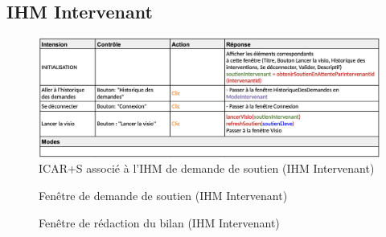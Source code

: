 \subsection{IHM Intervenant}

\begin{figure}[H]
    \centering
    \includegraphics[width=13cm]{ICARS/demandeInter.png}
    \caption{ICAR+S associé à l'IHM de demande de soutien (IHM Intervenant)}
\end{figure}

\begin{figure}[H]
    \centering
    \caption{Fenêtre de demande de soutien (IHM Intervenant)}
\end{figure}


\begin{figure}[H]
    \centering
    \caption{Fenêtre de rédaction du bilan (IHM Intervenant)}
\end{figure}

